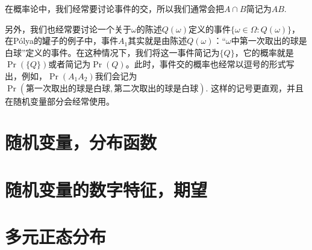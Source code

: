 \begin{remark}
    在概率论中，我们经常要讨论事件的交，所以我们通常会把$A\cap B$简记为$AB$.
    
    另外，我们也经常要讨论一个关于$\omega$的陈述$Q(\omega)$定义的事件$\{\omega\in\Omega:Q(\omega)\}$，在P\'olya的罐子的例子中，事件$A_1$其实就是由陈述$Q(\omega)$：“$\omega$中第一次取出的球是白球”定义的事件。在这种情况下，我们将这一事件简记为$\{Q\}$，它的概率就是$\Pr(\{Q\})$或者简记为$\Pr(Q)$。此时，事件交的概率也经常以逗号的形式写出，例如，$\Pr(A_1A_2)$我们会记为$\Pr(\text{第一次取出的球是白球},\text{第二次取出的球是白球})$. 这样的记号更直观，并且在随机变量部分会经常使用。
\end{remark}
\section{随机变量，分布函数}\label{sec:random-variable}

\section{随机变量的数字特征，期望}

\section{多元正态分布}